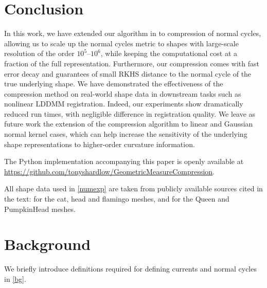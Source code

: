 \documentclass[sn-mathphys-num]{sn-jnl}%
\theoremstyle{thmstyleone}%
\theoremstyle{thmstyletwo}%
\theoremstyle{thmstylethree}%
\numberwithin{remark}{section}
\numberwithin{definition}{section}
\numberwithin{equation}{section}
\numberwithin{theorem}{section}
\begin{document}
\section{Conclusion}
In this work, we have extended our algorithm in \cite{SparseNystromCurrVar} to compression of normal cycles, allowing us to scale up the normal cycles metric to shapes with large-scale resolution of the order $10^{5}$--$10^{6}$, while keeping the computational cost at a fraction of the full representation. Furthermore, our compression comes with fast error decay and guarantees of small RKHS distance to the normal cycle of the true underlying shape. We have demonstrated the effectiveness of the compression method on real-world shape data in downstream tasks such as nonlinear LDDMM registration. Indeed, our experiments show dramatically reduced run times, with negligible difference in registration quality. We leave as future work the extension of the compression algorithm to linear and Gaussian normal kernel cases, which can help increase the sensitivity of the underlying shape representations to higher-order curvature information.

\backmatter

The Python implementation accompanying this paper is openly available at \url{https://github.com/tonyshardlow/GeometricMeasureCompression}.

All shape data used in \cref{numexp} are taken from publicly available sources cited in the text: \cite{ANIMdataset} for the cat, head and flamingo meshes, and \cite{Thingi10k} for the Queen and PumpkinHead meshes.

\appendix

\section{Background}\label{Appendix1}
We briefly introduce  definitions required for defining currents and normal cycles in \cref{bg}.
\end{document}
